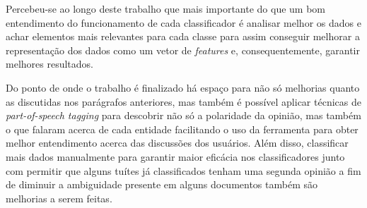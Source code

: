 Percebeu-se ao longo deste trabalho que mais importante do que um bom entendimento
do funcionamento de cada classificador é analisar melhor os dados e achar elementos
mais relevantes para cada classe para assim conseguir melhorar a representação dos dados
como um vetor de \textit{features} e, consequentemente, garantir melhores resultados.

Do ponto de onde o trabalho é finalizado há espaço para não só melhorias quanto as discutidas
nos parágrafos anteriores, mas também é possível aplicar técnicas de \textit{part-of-speech tagging}
para descobrir não só a polaridade da opinião, mas também o que falaram acerca de cada entidade
facilitando o uso da ferramenta para obter melhor entendimento acerca das discussões dos usuários.
Além disso, classificar mais dados manualmente para garantir maior eficácia nos classificadores
junto com permitir que alguns tuítes já classificados tenham uma segunda opinião a fim de
diminuir a ambiguidade presente em alguns documentos também são melhorias a serem feitas.
